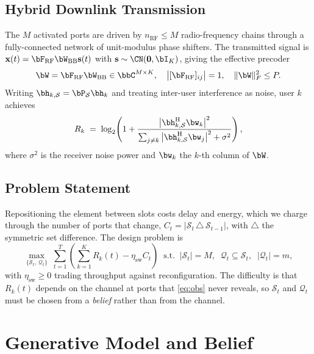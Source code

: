 \subsection{Hybrid Downlink Transmission}
The $M$ activated ports are driven by $n_{\mathrm{RF}}\le M$ radio-frequency
chains through a fully-connected network of unit-modulus phase shifters. The
transmitted signal is $\mathbf{x}(t)=\bF_{\mathrm{RF}}\bW_{\mathrm{BB}}
\mathbf{s}(t)$ with $\mathbf{s}\sim\CN(\mathbf{0},\bI_K)$, giving the effective
precoder
\begin{equation}
  \bW = \bF_{\mathrm{RF}}\bW_{\mathrm{BB}} \in \bbC^{M\times K},
  \quad
  \big|[\bF_{\mathrm{RF}}]_{ij}\big| = 1,
  \quad
  \|\bW\|_F^2 \le P .
  \label{eq:hybrid}
\end{equation}
Writing $\bh_{k,\mathcal{S}}=\bP_{\mathcal{S}}\bh_k$ and treating inter-user
interference as noise, user $k$ achieves
\begin{equation}
  R_k \;=\; \log_2\!\left(
    1+\frac{\big|\bh_{k,\mathcal{S}}^{\mathrm{H}}\bw_k\big|^2}
           {\sum_{j\neq k}\big|\bh_{k,\mathcal{S}}^{\mathrm{H}}\bw_j\big|^2+\sigma^2}
  \right),
  \label{eq:rate}
\end{equation}
where $\sigma^2$ is the receiver noise power and $\bw_k$ the $k$-th column of
$\bW$.

\subsection{Problem Statement}
Repositioning the element between slots costs delay and energy, which we charge
through the number of ports that change,
$C_t=|\mathcal{S}_t\,\triangle\,\mathcal{S}_{t-1}|$, with $\triangle$ the
symmetric set difference. The design problem is
\begin{equation}
  \max_{\{\mathcal{S}_t,\,\mathcal{Q}_t\}}\;
  \sum_{t=1}^{T}\left(\sum_{k=1}^{K}R_k(t)-\eta_{\mathrm{sw}}C_t\right)
  \;\;\text{s.t.}\;\;
  |\mathcal{S}_t|=M,\;\;
  \mathcal{Q}_t\subseteq\mathcal{S}_t,\;\;
  |\mathcal{Q}_t|=m,
  \label{eq:problem}
\end{equation}
with $\eta_{\mathrm{sw}}\ge0$ trading throughput against reconfiguration. The
difficulty is that $R_k(t)$ depends on the channel at ports that
\eqref{eq:obs} never reveals, so $\mathcal{S}_t$ and $\mathcal{Q}_t$ must be
chosen from a \emph{belief} rather than from the channel.

\section{Generative Model and Belief}
\label{sec:belief}

